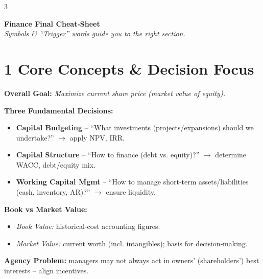 \documentclass[10pt,landscape,fleqn]{article}
\begin{document}
\scriptsize

\begin{multicols}{3}

\begin{center}
  {\Large\bfseries Finance Final Cheat‐Sheet}\\
  \scriptsize\emph{Symbols \& “Trigger” words guide you to the right section.}
\end{center}

\section*{1 Core Concepts \& Decision Focus}

\textbf{Overall Goal:} \emph{Maximize current share price (market value of equity).}

\textbf{Three Fundamental Decisions:}
\begin{itemize}
  \item \textbf{Capital Budgeting} – “What investments (projects/expansions) should we undertake?” $\to$ apply NPV, IRR.
  \item \textbf{Capital Structure} – “How to finance (debt vs. equity)?” $\to$ determine WACC, debt/equity mix.
  \item \textbf{Working Capital Mgmt} – “How to manage short‐term assets/liabilities (cash, inventory, AR)?” $\to$ ensure liquidity.
\end{itemize}

\textbf{Book vs Market Value:}
\begin{itemize}
  \item \emph{Book Value:} historical‐cost accounting figures. 
  \item \emph{Market Value:} current worth (incl. intangibles); basis for decision‐making.
\end{itemize}

\textbf{Agency Problem:} managers may not always act in owners’ (shareholders’) best interests – align incentives.


\end{multicols}
\end{document}
